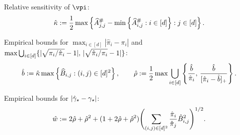 \begin{algorithm}[t]
\begin{algorithmic}[1]

  \STATE Relative sensitivity of $\vpi$:
  \begin{equation}
    \hat\kappa :=
    \frac12
    \max
    \left\{
      \widehat{A}_{j,j}^\# - \min\left\{ \widehat{A}_{i,j}^\# : i \in [d] \right\}
      : j \in [d]
    \right\} 
    .
    \notag
  \end{equation}
  \label{step:sens}

  \STATE Empirical bounds for $\max_{i \in [d]} |\hat{\pi}_i -
  \pi_i|$ and
  $\max\bigcup_{i\in[d]}
  \{
    |\sqrt{\pi_i/\hat\pi_i}-1|,\,
    |\sqrt{\hat\pi_i/\pi_i}-1|
  \}$:
  \begin{equation}
    \hat{b} := \hat\kappa \max\left\{
      \widehat{B}_{i,j}
      : (i,j) \in [d]^2
    \right\}
    , \qquad
    \hat\rho := \frac12 \max \bigcup_{i\in[d]}
    \left\{
      \frac{\hat{b}}{\hat\pi_i},\,
      \frac{\hat{b}}{[\hat\pi_i-\hat{b}]_+}
    \right\}
    .
    \notag
  \end{equation}
  \label{step:pi-bound}

  \STATE Empirical bounds for $|\hat\gamma_{\star}-\gamma_{\star}|$:
  \begin{equation}
    \hat{w} := 2\hat\rho + \hat\rho^2
    + (1+2\hat\rho+\hat\rho^2)
    \Biggl(
      \sum_{(i,j)\in[d]^2} \frac{\hat\pi_i}{\hat\pi_j} \hat{B}_{i,j}^2
    \Biggr)^{1/2} .
    \notag
  \end{equation}
  \label{step:gap-bound}


\end{algorithmic}
\end{algorithm}

